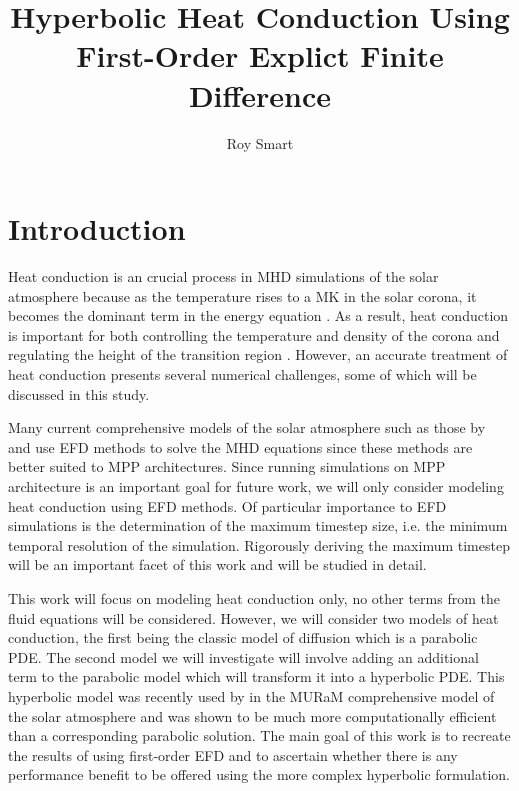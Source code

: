 \documentclass[iop]{emulateapj}
\begin{document}
	
	\title{Hyperbolic Heat Conduction Using First-Order Explict Finite Difference}
	\author{Roy Smart}
	
	\begin{abstract}
		
	\end{abstract}
	
	\section{Introduction}
	
		\noindent
		Heat conduction is an crucial process in \ac{MHD} simulations of the solar atmosphere because as the temperature rises to a MK in the solar corona, it becomes the dominant term in the energy equation \citep{gudiksen_11}.
			As a result, heat conduction is important for both controlling the temperature and density of the corona and regulating the height of the transition region \citep{bingert_11}.
			However, an accurate treatment of heat conduction presents several numerical challenges, some of which will be discussed in this study.
			
		Many current comprehensive models of the solar atmosphere such as those by \cite{gudiksen_05} and \cite{A} use \ac{EFD} methods to solve the \ac{MHD} equations since these methods are better suited to \ac{MPP} architectures.
			Since running simulations on \ac{MPP} architecture is an important goal for future work, we will only consider modeling heat conduction using \ac{EFD} methods.
			Of particular importance to \ac{EFD} simulations is the determination of the maximum timestep size, i.e. the minimum temporal resolution of the simulation.
			Rigorously deriving the maximum timestep will be an important facet of this work and will be studied in detail.
		
		This work will focus on modeling heat conduction only, no other terms from the fluid equations will be considered.
			However, we will consider two models of heat conduction, the first being the classic model of diffusion which is a parabolic \ac{PDE}.
			The second model we will investigate will involve adding an additional term to the parabolic model which will transform it into a hyperbolic \ac{PDE}.
			This hyperbolic model was recently used by \cite{A} in the MURaM comprehensive model of the solar atmosphere and was shown to be much more computationally efficient than a corresponding parabolic solution.
			The main goal of this work is to recreate the results of \cite{A} using first-order \ac{EFD} and to ascertain whether there is any performance benefit to be offered using the more complex hyperbolic formulation.
		
\end{document}
